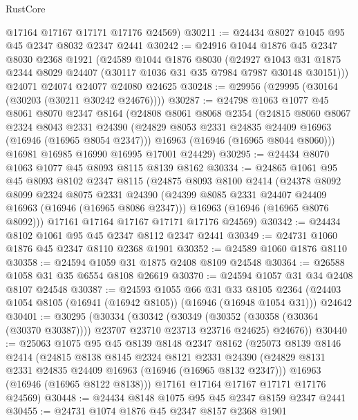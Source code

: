 \begin{lexlean}{RustCore}
\begin{coremodule}
      @17164
      @17167
      @17171
      @17176
      @24569)
@30211 := @24434 @8027 @1045 @95 @45 @2347 @8032 @2347 @2441
@30242 := @24916
    @1044
    @1876
    @45
    @2347
    @8030
    @2368
    @1921
    (@24589
      @1044
      @1876
      @8030
      (@24927 @1043 @31 @1875 @2344 @8029 @24407 (@30117 @1036 @31 @35 @7984 @7987 @30148 @30151)))
    @24071
    @24074
    @24077
    @24080
    @24625
@30248 := @29956 (@29995 (@30164 (@30203 (@30211 @30242 @24676))))
@30287 := @24798
    @1063
    @1077
    @45
    @8061
    @8070
    @2347
    @8164
    (@24808
      @8061
      @8068
      @2354
      (@24815
        @8060
        @8067
        @2324
        @8043
        @2331
        @24390
        (@24829 @8053 @2331 @24835 @24409 @16963 (@16946 (@16965 @8054 @2347)))
        @16963
        (@16946 (@16965 @8044 @8060)))
      @16981
      @16985
      @16990
      @16995
      @17001
      @24429)
@30295 := @24434 @8070 @1063 @1077 @45 @8093 @8115 @8139 @8162
@30334 := @24865
    @1061
    @95
    @45
    @8093
    @8102
    @2347
    @8115
    (@24875
      @8093
      @8100
      @2414
      (@24378
        @8092
        @8099
        @2324
        @8075
        @2331
        @24390
        (@24399 @8085 @2331 @24407 @24409 @16963 (@16946 (@16965 @8086 @2347)))
        @16963
        (@16946 (@16965 @8076 @8092)))
      @17161
      @17164
      @17167
      @17171
      @17176
      @24569)
@30342 := @24434 @8102 @1061 @95 @45 @2347 @8112 @2347 @2441
@30349 := @24731 @1060 @1876 @45 @2347 @8110 @2368 @1901
@30352 := @24589 @1060 @1876 @8110
@30358 := @24594 @1059 @31 @1875 @2408 @8109 @24548
@30364 := @26588 @1058 @31 @35 @6554 @8108 @26619
@30370 := @24594 @1057 @31 @34 @2408 @8107 @24548
@30387 := @24593
    @1055
    @66
    @31
    @33
    @8105
    @2364
    (@24403 @1054 @8105 (@16941 (@16942 @8105)) (@16946 (@16948 @1054 @31)))
    @24642
@30401 := @30295
    (@30334
      (@30342
        (@30349 (@30352 (@30358 (@30364 (@30370 @30387)))) @23707 @23710 @23713 @23716 @24625)
        @24676))
@30440 := @25063
    @1075
    @95
    @45
    @8139
    @8148
    @2347
    @8162
    (@25073
      @8139
      @8146
      @2414
      (@24815
        @8138
        @8145
        @2324
        @8121
        @2331
        @24390
        (@24829 @8131 @2331 @24835 @24409 @16963 (@16946 (@16965 @8132 @2347)))
        @16963
        (@16946 (@16965 @8122 @8138)))
      @17161
      @17164
      @17167
      @17171
      @17176
      @24569)
@30448 := @24434 @8148 @1075 @95 @45 @2347 @8159 @2347 @2441
@30455 := @24731 @1074 @1876 @45 @2347 @8157 @2368 @1901

\end{coremodule}
\end{lexlean}
